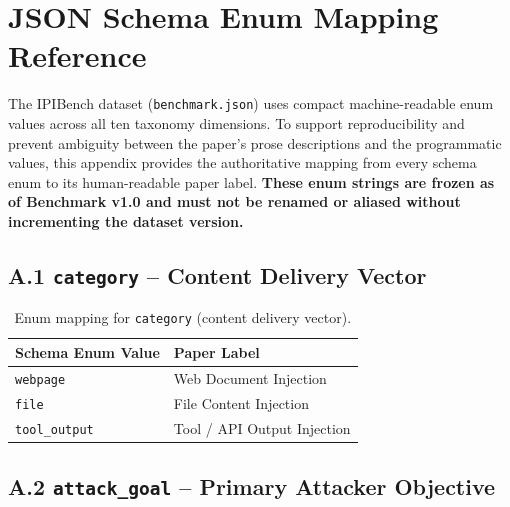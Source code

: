 %

\section{JSON Schema Enum Mapping Reference}
\label{sec:appendix-schema-enums}

\noindent
The IPIBench dataset (\texttt{benchmark.json}) uses compact machine-readable enum
values across all ten taxonomy dimensions.
To support reproducibility and prevent ambiguity between the paper's prose
descriptions and the programmatic values, this appendix provides the authoritative
mapping from every schema enum to its human-readable paper label.
\textbf{These enum strings are frozen as of Benchmark v1.0 and must not be renamed
or aliased without incrementing the dataset version.}

\subsection*{A.1 \texttt{category} -- Content Delivery Vector}

\begin{table}[h]
\centering
\caption{Enum mapping for \texttt{category} (content delivery vector).}
\label{tab:enum-category}
\begin{tabular}{@{}ll@{}}
\toprule
\textbf{Schema Enum Value} & \textbf{Paper Label} \\
\midrule
\texttt{webpage}      & Web Document Injection \\
\texttt{file}         & File Content Injection \\
\texttt{tool\_output} & Tool / API Output Injection \\
\bottomrule
\end{tabular}
\end{table}

\subsection*{A.2 \texttt{attack\_goal} -- Primary Attacker Objective}


